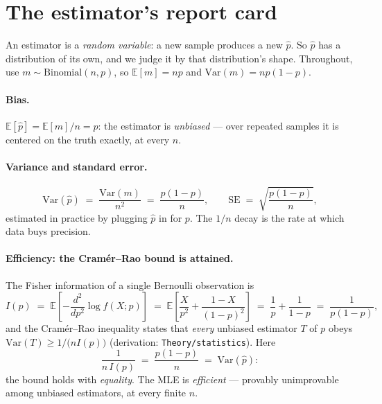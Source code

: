 \documentclass[11pt]{article}
\newcommand{\phat}{\hat{p}}
\begin{document}
\section{The estimator's report card}
\label{sec:reportcard}

An estimator is a \emph{random variable}: a new sample produces a new
$\phat$. So $\phat$ has a distribution of its own, and we judge it by
that distribution's shape. Throughout, use $m \sim \mathrm{Binomial}(n,p)$,
so $\mathbb{E}[m] = np$ and $\mathrm{Var}(m) = np(1-p)$.

\paragraph{Bias.} $\mathbb{E}[\phat] = \mathbb{E}[m]/n = p$: the
estimator is \emph{unbiased} --- over repeated samples it is centered on
the truth exactly, at every $n$.

\paragraph{Variance and standard error.}
\begin{equation}
  \mathrm{Var}(\phat) \;=\; \frac{\mathrm{Var}(m)}{n^{2}}
  \;=\; \frac{p(1-p)}{n},
  \qquad
  \mathrm{SE} \;=\; \sqrt{\frac{p(1-p)}{n}},
  \label{eq:var}
\end{equation}
estimated in practice by plugging $\phat$ in for $p$. The $1/n$ decay is
the rate at which data buys precision.

\paragraph{Efficiency: the Cram\'er--Rao bound is attained.}
The Fisher information of a single Bernoulli observation is
\begin{equation*}
  I(p) \;=\; \mathbb{E}\!\left[-\frac{d^{2}}{dp^{2}}
  \log f(X;p)\right]
  \;=\; \mathbb{E}\!\left[\frac{X}{p^{2}} + \frac{1-X}{(1-p)^{2}}\right]
  \;=\; \frac{1}{p} + \frac{1}{1-p}
  \;=\; \frac{1}{p(1-p)},
\end{equation*}
and the Cram\'er--Rao inequality states that \emph{every} unbiased
estimator $T$ of $p$ obeys $\mathrm{Var}(T) \ge 1/\bigl(n I(p)\bigr)$
(derivation: \texttt{Theory/statistics}). Here
\begin{equation}
  \frac{1}{n\,I(p)} \;=\; \frac{p(1-p)}{n} \;=\; \mathrm{Var}(\phat):
  \label{eq:crlb}
\end{equation}
the bound holds with \emph{equality}. The MLE is \emph{efficient} ---
provably unimprovable among unbiased estimators, at every finite $n$.
\end{document}
